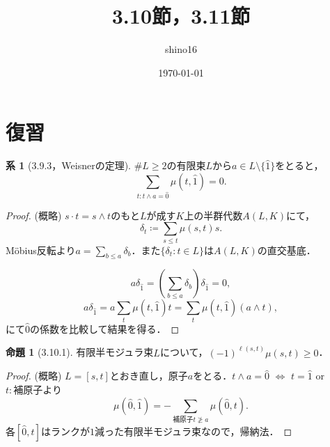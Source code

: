 \documentclass[xelatex,ja=standard,a4paper,14pt,everyparhook=compat]{bxjsarticle}
\title{3.10節，3.11節}
\author{shino16}
\date{\today}
\newcommand{\paren}[1]{\left(#1\right)}
\theoremstyle{definition}
\newtheorem*{proposition*}{命題}
\newtheorem*{corollary*}{系}
\begin{document}
\maketitle

\tableofcontents

\newpage

\setcounter{section}{-1}
\section{復習}

\begin{corollary*}[3.9.3，Weisnerの定理]
    $\#L \geq 2$の有限束$L$から$a \in L \setminus \{\hat1\}$をとると， \begin{equation*}
        \sum_{t : t \land a = \hat0} \mu(t, \hat1) = 0.
    \end{equation*}
\end{corollary*}
\begin{proof}
    (概略) $s \cdot t = s \land t$のもと$L$が成す$K$上の半群代数$A(L,K)$にて，
    \begin{equation*}
        \delta_t \coloneqq \sum_{s \leq t} \mu(s,t) s.
    \end{equation*}
    M\"obius反転より$a = \sum_{b \leq a} \delta_b$．また$\{\delta_t : t \in L\}$は$A(L,K)$の直交基底．

    \begin{equation*}
        a \delta_{\hat1} = \paren{\sum_{b \leq a} \delta_b} \delta_{\hat1} = 0,
    \end{equation*}
    \begin{equation*}
        a \delta_{\hat1} = a \sum_t \mu(t,\hat1) t = \sum_t \mu(t,\hat1) (a \land t),
    \end{equation*}
    にて$\hat0$の係数を比較して結果を得る．
\end{proof}

\begin{proposition*}[3.10.1]
    有限半モジュラ束$L$について，$(-1)^{\ell(s,t)}\mu(s,t) \geq 0$．
\end{proposition*}
\begin{proof}
    (概略) $L=[s,t]$とおき直し，原子$a$をとる．$t \land a = \hat0$ $\Leftrightarrow$ $t = \hat1$ or $t:\text{補原子}$より \begin{equation}
        \mu(\hat0,\hat1) = -\sum_{\text{補原子$t \not\geq a$}} \mu(\hat0, t).
    \end{equation}
    各$[\hat0,t]$はランクが$1$減った有限半モジュラ束なので，帰納法．
\end{proof}
\end{document}
